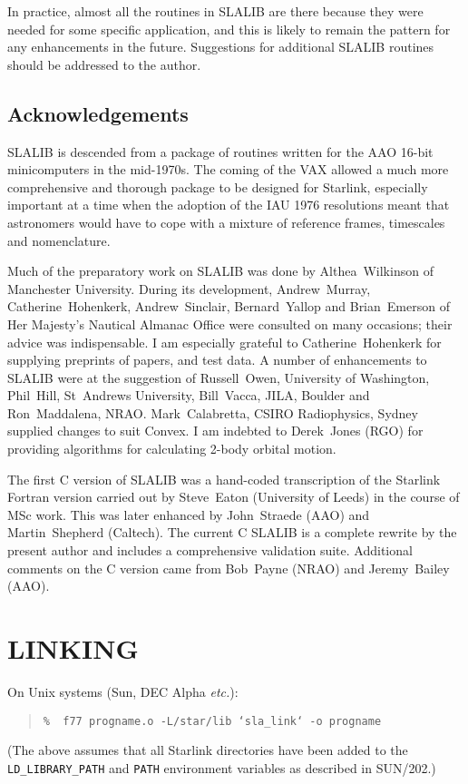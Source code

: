 \documentclass[11pt,twoside]{article}
\begin{document}
In practice, almost all the routines in SLALIB are there because they were
needed for some specific application, and this is likely to remain the
pattern for any enhancements in the future.
Suggestions for additional SLALIB routines should be addressed to the
author.

\subsection{Acknowledgements}
SLALIB is descended from a package of routines written
for the AAO 16-bit minicomputers
in the mid-1970s.  The coming of the VAX
allowed a much more comprehensive and thorough package
to be designed for Starlink, especially important
at a time when the adoption
of the IAU 1976 resolutions meant that astronomers
would have to cope with a mixture of reference frames,
timescales and nomenclature.

Much of the preparatory work on SLALIB was done by
Althea~Wilkinson of Manchester University.
During its development,
Andrew~Murray,
Catherine~Hohenkerk,
Andrew~Sinclair,
Bernard~Yallop
and
Brian~Emerson of Her Majesty's Nautical Almanac Office were consulted
on many occasions; their advice was indispensable.
I am especially grateful to
Catherine~Hohenkerk
for supplying preprints of papers, and test data. A number of
enhancements to SLALIB were at the suggestion of
Russell~Owen, University of Washington,
Phil~Hill, St~Andrews University,
Bill~Vacca, JILA, Boulder and
Ron~Maddalena, NRAO.
Mark~Calabretta, CSIRO Radiophysics, Sydney supplied changes to suit Convex.
I am indebted to Derek~Jones (RGO) for providing algorithms for
calculating 2-body orbital motion.

The first C version of SLALIB was a hand-coded transcription
of the Starlink Fortran version carried out by
Steve~Eaton (University of Leeds) in the course of
MSc work.  This was later
enhanced by John~Straede (AAO) and Martin~Shepherd (Caltech).
The current C SLALIB is a complete rewrite by the present author and
includes a comprehensive validation suite.
Additional comments on the C version came from Bob~Payne (NRAO) and
Jeremy~Bailey (AAO).

\section{LINKING}

On Unix systems (Sun, DEC Alpha {\it etc.}):
\begin{verse}
{\tt \%~~f77 progname.o -L/star/lib `sla\_link` -o progname}
\end{verse}
(The above assumes that all Starlink directories have been added to
the {\tt LD\_LIBRARY\_PATH} and {\tt PATH} environment variables
as described in SUN/202.)
\end{document}
